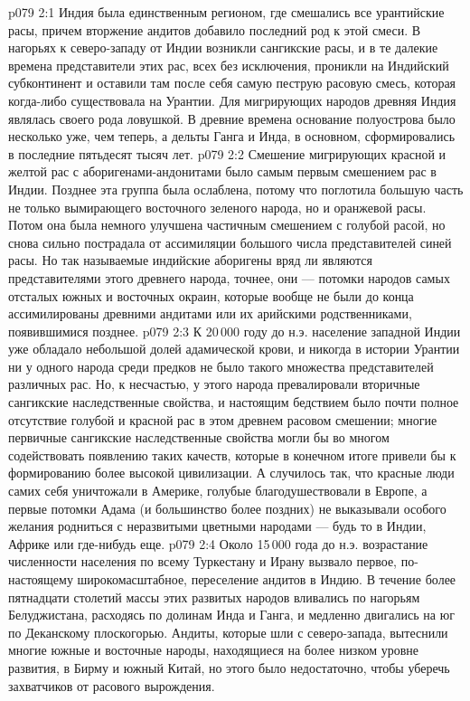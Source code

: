 \vs p079 2:1 Индия была единственным регионом, где смешались все урантийские расы, причем вторжение андитов добавило последний род к этой смеси. В нагорьях к северо\hyp{}западу от Индии возникли сангикские расы, и в те далекие времена представители этих рас, всех без исключения, проникли на Индийский субконтинент и оставили там после себя самую пеструю расовую смесь, которая когда\hyp{}либо существовала на Урантии. Для мигрирующих народов древняя Индия являлась своего рода ловушкой. В древние времена основание полуострова было несколько уже, чем теперь, а дельты Ганга и Инда, в основном, сформировались в последние пятьдесят тысяч лет.
\vs p079 2:2 Смешение мигрирующих красной и желтой рас с аборигенами\hyp{}андонитами было самым первым смешением рас в Индии. Позднее эта группа была ослаблена, потому что поглотила большую часть не только вымирающего восточного зеленого народа, но и оранжевой расы. Потом она была немного улучшена частичным смешением с голубой расой, но снова сильно пострадала от ассимиляции большого числа представителей синей расы. Но так называемые индийские аборигены вряд ли являются представителями этого древнего народа, точнее, они --- потомки народов самых отсталых южных и восточных окраин, которые вообще не были до конца ассимилированы древними андитами или их арийскими родственниками, появившимися позднее.
\vs p079 2:3 \pc К 20\,000 году до н.э. население западной Индии уже обладало небольшой долей адамической крови, и никогда в истории Урантии ни у одного народа среди предков не было такого множества представителей различных рас. Но, к несчастью, у этого народа превалировали вторичные сангикские наследственные свойства, и настоящим бедствием было почти полное отсутствие голубой и красной рас в этом древнем расовом смешении; многие первичные сангикские наследственные свойства могли бы во многом содействовать появлению таких качеств, которые в конечном итоге привели бы к формированию более высокой цивилизации. А случилось так, что красные люди самих себя уничтожали в Америке, голубые благодушествовали в Европе, а первые потомки Адама (и большинство более поздних) не выказывали особого желания родниться с неразвитыми цветными народами --- будь то в Индии, Африке или где\hyp{}нибудь еще.
\vs p079 2:4 \pc Около 15\,000 года до н.э. возрастание численности населения по всему Туркестану и Ирану вызвало первое, по\hyp{}настоящему широкомасштабное, переселение андитов в Индию. В течение более пятнадцати столетий массы этих развитых народов вливались по нагорьям Белуджистана, расходясь по долинам Инда и Ганга, и медленно двигались на юг по Деканскому плоскогорью. Андиты, которые шли с северо\hyp{}запада, вытеснили многие южные и восточные народы, находящиеся на более низком уровне развития, в Бирму и южный Китай, но этого было недостаточно, чтобы уберечь захватчиков от расового вырождения.
